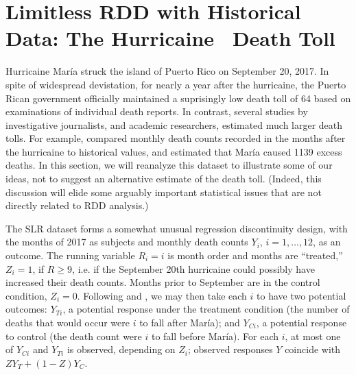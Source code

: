 
\section{Limitless RDD with Historical Data: The Hurricaine \maria\
Death Toll}\label{sec:maria}







Hurricaine Mar\'{i}a struck the island of Puerto Rico on September 20,
2017.
In spite of widespread devistation, for nearly a year after the
hurricaine, the Puerto Rican government officially maintained a
suprisingly low death toll of 64 based on examinations of individual
death reports.
In contrast, several studies by investigative journalists, and academic
researchers, estimated much larger death tolls.
For example, \citet[][; henceforth SLH]{santos2018use} compared monthly death counts recorded in the
months after the hurricaine to historical values, and estimated that
Mar\'{i}a caused 1139 excess
deaths.
In this section, we will reanalyze this dataset to illustrate some
of our ideas, not to suggest an alternative estimate of the death
toll.
(Indeed, this discussion will elide some arguably important
statistical issues that are not directly related to RDD analysis.)

The SLR dataset forms a somewhat unusual regression
discontinuity design, with the months of 2017 as subjects and monthly death
counts $Y_i$, $i=1,\dots,12$, as an outcome.
The running variable $R_i=i$ is month order and months are
``treated,'' $Z_i=1$,
if $R\ge 9$, i.e. if the September 20th hurricaine could possibly have
increased their death counts.
Months prior to September are in the control condition, $Z_i=0$.
Following \citet{neyman:1923} and \citet{rubin1974estimating}, we may
then take each $i$ to have two potential outcomes: $Y_{Ti}$, a potential
response under the treatment condition (the number of deaths that
would occur were $i$ to fall after Mar\'{i}a); and $Y_{Ci}$, a potential response to
control (the death count were $i$ to fall before Mar\'{i}a).
For each $i$, at most one of $Y_{Ci}$ and $Y_{Ti}$ is
observed, depending on $Z_i$; observed responses $Y$ coincide with
$ZY_{T}+(1-Z)Y_{C}$.

